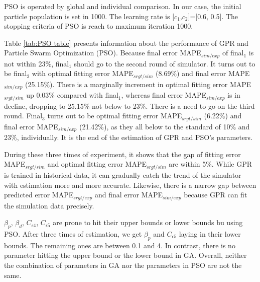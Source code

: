 PSO is operated by global and individual comparison. In our case, the initial particle population is set in 1000. The learning rate is [$c_{1}$,$c_{2}$]=[0.6, 0.5]. The stopping criteria of PSO is reach to maximum iteration 1000.

Table \ref{tab:PSO table} presents information about the performance of GPR and Particle Swarm Optimization (PSO). Because final error MAPE$_{sim/exp}$ of final${_1}$ is not within 23${\%}$, final${_1}$ should go to the second round of simulator. It turns out to be final${_2}$ with optimal fitting error MAPE$_{srgt/sim}$ (8.69${\%}$) and final error MAPE$_{sim/exp}$ (25.15${\%}$). There is a marginally increment in optimal fitting error MAPE$_{srgt/sim}$ up 0.03${\%}$ compared with final${_1}$, whereas final error MAPE$_{sim/exp}$ is in decline, dropping to 25.15${\%}$ not below to 23${\%}$. There is a need to go on the third round. Final${_3}$ turns out to be optimal fitting error MAPE$_{srgt/sim}$ (6.22${\%}$) and final error MAPE$_{sim/exp}$ (21.42${\%}$), as they all below to the standard of 10${\%}$ and 23${\%}$, individually. It is the end of the estimation of GPR and PSO's parameters.

During these three times of experiment, it shows that the gap of fitting error MAPE$_{srgt/sim}$ and optimal fitting error MAPE$_{srgt/sim}$ are within 5${\%}$. While GPR is trained in historical data, it can gradually catch the trend of the simulator with estimation more and more accurate. Likewise, there is a narrow gap between predicted error MAPE$_{srgt/exp}$ and final error MAPE$_{sim/exp}$ because GPR can fit the simulation data precisely.

$\beta_{p}$, $\beta_{d}$, $C_{\epsilon4}$, $C_{\epsilon5}$ are prone to hit their upper bounds or lower bounds bu using PSO. After three times of estimation, we get $\beta_{p}$ and $C_{\epsilon5}$ laying in their lower bounds. The remaining ones are between 0.1 and 4. In contrast, there is no parameter hitting the upper bound or the lower bound in GA. Overall, neither the combination of parameters in GA nor the parameters in PSO are not the same. 

